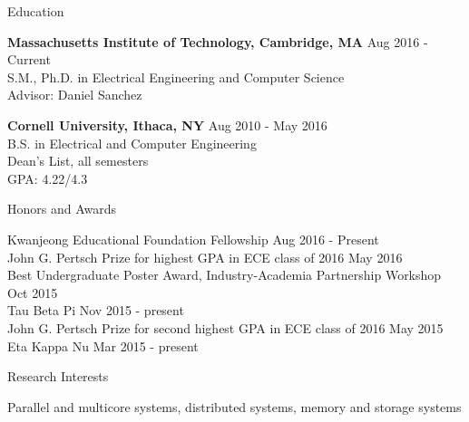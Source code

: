 \documentclass{resume} %
\begin{document}

\begin{rSection}{Education}

{\bf Massachusetts Institute of Technology, Cambridge, MA} \hfill { Aug 2016 - Current} \\ 
S.M., Ph.D. in Electrical Engineering and Computer Science \\
Advisor: Daniel Sanchez

{\bf Cornell University, Ithaca, NY} \hfill { Aug 2010 - May 2016} \\ 
B.S. in Electrical and Computer Engineering \\
Dean's List, all semesters \\
GPA: 4.22/4.3 

\end{rSection}


\begin{rSection}{Honors and Awards}

Kwanjeong Educational Foundation Fellowship \hfill {Aug 2016 - Present} \\
John G. Pertsch Prize for highest GPA in ECE class of 2016 \hfill{May 2016} \\
Best Undergraduate Poster Award, Industry-Academia Partnership Workshop \hfill { Oct 2015} \\
Tau Beta Pi \hfill { Nov 2015 - present} \\
John G. Pertsch Prize for second highest GPA in ECE class of 2016 \hfill { May 2015} \\
Eta Kappa Nu \hfill { Mar 2015 - present} 

\end{rSection}


\begin{rSection}{Research Interests}

Parallel and multicore systems, distributed systems, memory and storage systems

\end{rSection}
\end{document}
